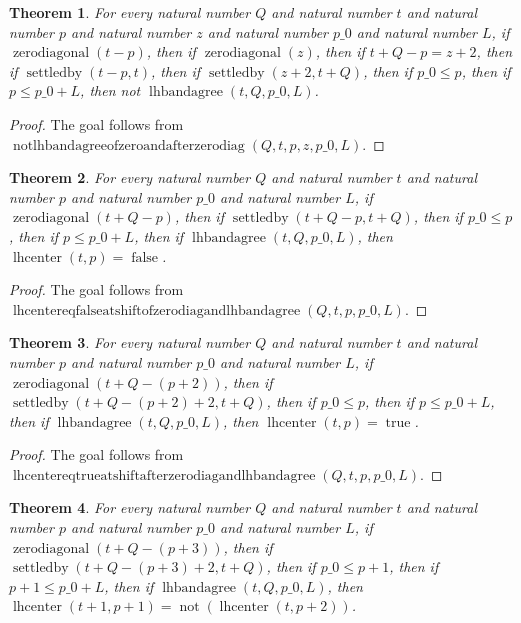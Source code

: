 \documentclass[11pt]{article}
\newtheorem{theorem}{Theorem}[section]
\theoremstyle{definition}
\begin{document}
\begin{theorem}
\label{ll:paper:not-lhbandagree-of-zero-and-after-zero-diag}
For every natural number \(Q\) and natural number \(t\) and natural number \(p\) and natural number \(z\) and natural number \(p\_0\) and natural number \(L\), if \(\operatorname{zerodiagonal}(t - p)\), then if \(\operatorname{zerodiagonal}(z)\), then if \(t + Q - p = z + 2\), then if \(\operatorname{settledby}(t - p, t)\), then if \(\operatorname{settledby}(z + 2, t + Q)\), then if \(p\_0 \le p\), then if \(p \le p\_0 + L\), then not \(\operatorname{lhbandagree}(t, Q, p\_0, L)\).
\end{theorem}
\begin{proof}
The goal follows from \(\operatorname{notlhbandagreeofzeroandafterzerodiag}(Q, t, p, z, p\_0, L)\).
\end{proof}
\begin{theorem}
\label{ll:paper:lhcenter-eq-false-at-shift-of-zero-diag-and-lhbandagree}
For every natural number \(Q\) and natural number \(t\) and natural number \(p\) and natural number \(p\_0\) and natural number \(L\), if \(\operatorname{zerodiagonal}(t + Q - p)\), then if \(\operatorname{settledby}(t + Q - p, t + Q)\), then if \(p\_0 \le p\), then if \(p \le p\_0 + L\), then if \(\operatorname{lhbandagree}(t, Q, p\_0, L)\), then \(\operatorname{lhcenter}(t, p) = \operatorname{false}\).
\end{theorem}
\begin{proof}
The goal follows from \(\operatorname{lhcentereqfalseatshiftofzerodiagandlhbandagree}(Q, t, p, p\_0, L)\).
\end{proof}
\begin{theorem}
\label{ll:paper:lhcenter-eq-true-at-shift-after-zero-diag-and-lhbandagree}
For every natural number \(Q\) and natural number \(t\) and natural number \(p\) and natural number \(p\_0\) and natural number \(L\), if \(\operatorname{zerodiagonal}(t + Q - (p + 2))\), then if \(\operatorname{settledby}(t + Q - (p + 2) + 2, t + Q)\), then if \(p\_0 \le p\), then if \(p \le p\_0 + L\), then if \(\operatorname{lhbandagree}(t, Q, p\_0, L)\), then \(\operatorname{lhcenter}(t, p) = \operatorname{true}\).
\end{theorem}
\begin{proof}
The goal follows from \(\operatorname{lhcentereqtrueatshiftafterzerodiagandlhbandagree}(Q, t, p, p\_0, L)\).
\end{proof}
\begin{theorem}
\label{ll:paper:lhcenter-step-flip-at-shift-after-zero-diag-of-single-lhbandagree}
For every natural number \(Q\) and natural number \(t\) and natural number \(p\) and natural number \(p\_0\) and natural number \(L\), if \(\operatorname{zerodiagonal}(t + Q - (p + 3))\), then if \(\operatorname{settledby}(t + Q - (p + 3) + 2, t + Q)\), then if \(p\_0 \le p + 1\), then if \(p + 1 \le p\_0 + L\), then if \(\operatorname{lhbandagree}(t, Q, p\_0, L)\), then \(\operatorname{lhcenter}(t + 1, p + 1) = \operatorname{not}(\operatorname{lhcenter}(t, p + 2))\).
\end{theorem}
\end{document}
